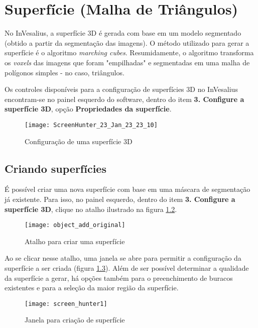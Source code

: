 \chapter{Superfície (Malha de Triângulos)}

No InVesalius, a superfície 3D é gerada com base em um modelo segmentado (obtido a partir
da segmentação das imagens). O método utilizado para gerar a superfície é o algoritmo 
\textit{marching cubes}. Resumidamente, o algoritmo transforma os \textit{voxels} das
imagens que foram "empilhadas" e segmentadas em uma malha de polígonos simples - no caso,
triângulos.

Os controles disponíveis para a configuração de superfícies 3D no InVesalius encontram-se
no painel esquerdo do software, dentro do item \textbf{3. Configure a superfície 3D}, opção
\textbf{Propriedades da superfície}.

\begin{figure}[!htb]
\centering
\texttt{[image: ScreenHunter\_23\_Jan\_23\_23\_10]}
\caption{Configuração de uma superfície 3D}
\label{fig:3d_surface_managment}
\end{figure}


\section{Criando superfícies}

É possível criar uma nova superfície com base em uma máscara de segmentação já existente.
Para isso, no painel esquerdo, dentro do item \textbf{3. Configure a superfície 3D}, clique
no atalho ilustrado na figura \ref{fig:shortcut_new_surface}.

\begin{figure}[!htb]
\centering
\texttt{[image: object\_add\_original]}
\caption{Atalho para criar uma superfície}
\label{fig:shortcut_new_surface}
\end{figure}

Ao se clicar nesse atalho, uma janela se abre para permitir a configuração da superfície a
ser criada (figura \ref{fig:create_surface_1}). Além de ser possível determinar a qualidade
da superfície a gerar, há opções também para o preenchimento de buracos existentes e para a
seleção da maior região da superfície.

\begin{figure}[!htb]
\centering
\texttt{[image: screen\_hunter1]}
\caption{Janela para criação de superfície}
\label{fig:create_surface_1}
\end{figure}

